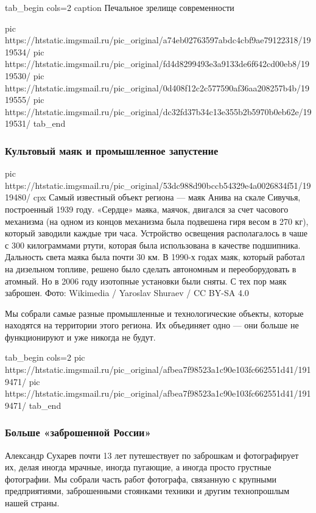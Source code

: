 \ifcmt
tab_begin cols=2
  caption Печальное зрелище современности

  pic https://htstatic.imgsmail.ru/pic_original/a74eb02763597abdc4cbf9ae79122318/1919534/
  pic https://htstatic.imgsmail.ru/pic_original/fd4d8299493e3a9133de6f642cd00eb8/1919530/
  pic https://htstatic.imgsmail.ru/pic_original/0d408f12c2c577590af36aa208257b4b/1919555/
  pic https://htstatic.imgsmail.ru/pic_original/dc32fd37b34c13e355b2b5970b0eb62e/1919531/
tab_end
\fi

\subsubsection{Культовый маяк и промышленное запустение }

\ifcmt
pic https://htstatic.imgsmail.ru/pic_original/53dc988d90bccb54329e4a0026834f51/1919480/
cpx Самый известный объект региона — маяк Анива на скале Сивучья, построенный 1939 году. «Сердце» маяка, маячок, двигался за счет часового механизма (на одном из концов механизма была подвешена гиря весом в 270 кг), который заводили каждые три часа. Устройство освещения располагалось в чаше с 300 килограммами ртути, которая была использована в качестве подшипника. Дальность света маяка была почти 30 км. В 1990-х годах маяк, который работал на дизельном топливе, решено было сделать автономным и переоборудовать в атомный. Но в 2006 году изотопные установки были сняты. С тех пор маяк заброшен. Фото: Wikimedia / Yaroslav Shuraev / CC BY-SA 4.0
\fi

Мы собрали самые разные промышленные и технологические объекты, которые
находятся на территории этого региона. Их объединяет одно — они больше не
функционируют и уже никогда не будут.

\ifcmt
tab_begin cols=2
pic https://htstatic.imgsmail.ru/pic_original/afbea7f98523a1c90e103fc662551d41/1919471/
pic https://htstatic.imgsmail.ru/pic_original/afbea7f98523a1c90e103fc662551d41/1919471/
tab_end
\fi

\subsubsection{Больше «заброшенной России»}

Александр Сухарев почти 13 лет путешествует по заброшкам и фотографирует их,
делая иногда мрачные, иногда пугающие, а иногда просто грустные фотографии. Мы
собрали часть работ фотографа, связанную с крупными предприятиями, заброшенными
стоянками техники и другим технопрошлым нашей страны.
